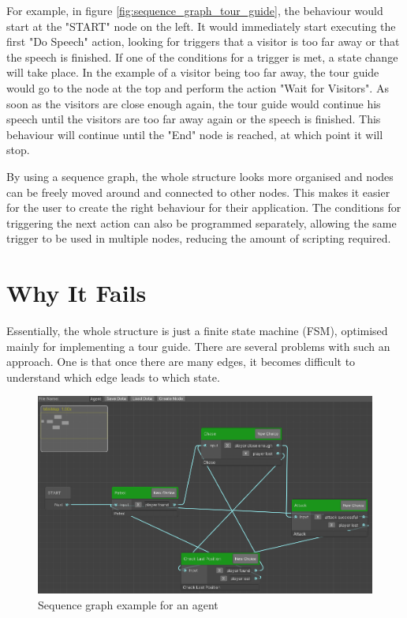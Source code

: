 For example, in figure \ref{fig:sequence_graph_tour_guide}, the behaviour would start at the "START" node on the left. It would immediately start executing the first "Do Speech" action, looking for triggers that a visitor is too far away or that the speech is finished. If one of the conditions for a trigger is met, a state change will take place. In the example of a visitor being too far away, the tour guide would go to the node at the top and perform the action "Wait for Visitors". As soon as the visitors are close enough again, the tour guide would continue his speech until the visitors are too far away again or the speech is finished. This behaviour will continue until the "End" node is reached, at which point it will stop.

By using a sequence graph, the whole structure looks more organised and nodes can be freely moved around and connected to other nodes. This makes it easier for the user to create the right behaviour for their application. The conditions for triggering the next action can also be programmed separately, allowing the same trigger to be used in multiple nodes, reducing the amount of scripting required.

\section{Why It Fails}
\label{sec:projectevolution_whyitfails}

Essentially, the whole structure is just a finite state machine (FSM), optimised mainly for implementing a tour guide. There are several problems with such an approach. One is that once there are many edges, it becomes difficult to understand which edge leads to which state.

\begin{figure}[H]
	\centering
		\includegraphics[scale=0.45]{images/sequence_graph_agent.png}
	\caption{Sequence graph example for an agent}
	\label{fig:sequence_graph_agent}
\end{figure}

